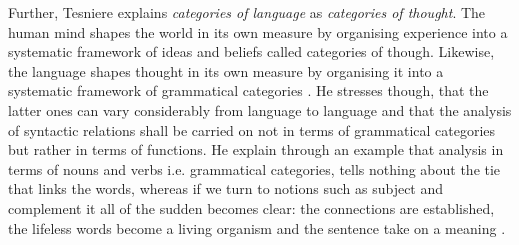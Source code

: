 Further, Tesniere explains \textit{categories of language} as \textit{categories of thought}. The human mind shapes the world in its own measure by organising experience into a systematic framework of ideas and beliefs called categories of though. Likewise, the language shapes thought in its own measure by organising it into a systematic framework of grammatical categories \citep{Tesniere2015}. He stresses though, that the latter ones can vary considerably from language to language and that the analysis of syntactic relations shall be carried on not in terms of grammatical categories but rather in terms of functions. He explain through an example that analysis in terms of nouns and verbs i.e. grammatical categories, tells nothing about the tie that links the words, whereas if we turn to notions such as subject and complement it all of the sudden becomes clear: the connections are established, the lifeless words become a living organism and the sentence take on a meaning \citep{Tesniere2015}.